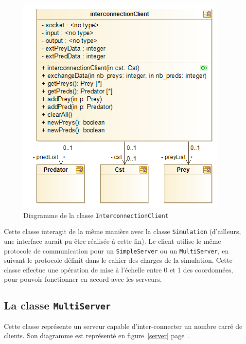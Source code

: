 \documentclass[12pt,a4paper,titlepage]{article}
\begin{document}
\begin{figure}[h]
\includegraphics[width = \textwidth]{"../diagrammes/client"}
\caption{Diagramme de la classe \texttt{InterconnectionClient}}
\label{client}
\end{figure}

Cette classe interagit de la même manière avec la classe \texttt{Simulation} (d'ailleurs, une interface aurait pu être réalisée à cette fin). Le client utilise le même protocole de communication pour un \texttt{SimpleServer} ou un \texttt{MultiServer}, en suivant le protocole définit dans le cahier des charges de la simulation. Cette classe effectue une opération de mise à l'échelle entre 0 et 1 des coordonnées, pour pouvoir fonctionner en accord avec les serveurs.
\FloatBarrier
\subsection{La classe \texttt{MultiServer}}
\FloatBarrier
Cette classe représente un serveur capable d'inter-connecter un nombre carré de clients. Son diagramme est représenté en figure~\ref{server} page~\pageref{server}.
\end{document}
